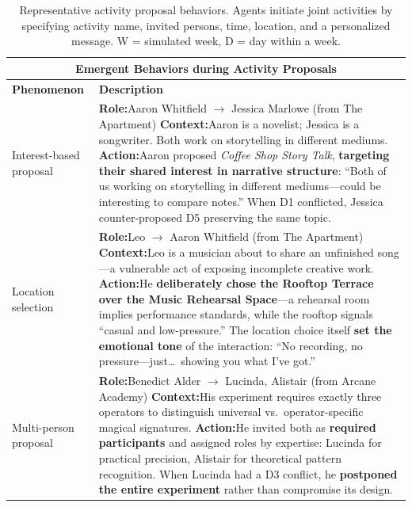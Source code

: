   \begin{table}[t]
  \centering
  \small
  \caption{Representative activity proposal behaviors. Agents initiate joint activities by specifying activity name, invited persons, time, location, and a personalized message. W = simulated week, D = day within a week.}
  \label{tab:proposals}
  \begin{tabular}{p{0.8in}p{4.3in}}
  \toprule
  \multicolumn{2}{c}{\textbf{Emergent Behaviors during Activity Proposals}} \\
  \midrule
  \textbf{Phenomenon} & \textbf{Description} \\
  \midrule
  
  Interest-based \newline proposal
  &
  \textbf{Role:}\quad Aaron Whitfield $\to$ Jessica Marlowe \hfill (from The Apartment) \newline
  \textbf{Context:}\quad Aaron is a novelist; Jessica is a songwriter. Both work on storytelling in different mediums. \newline
  \textbf{Action:}\quad Aaron proposed \emph{Coffee Shop Story Talk}, \textbf{targeting their shared interest in narrative structure}: ``Both of us working on storytelling in different mediums---could be interesting to compare notes.'' When D1 conflicted, Jessica counter-proposed D5 preserving the same topic.
  \\
  \midrule
  
  Location \newline selection
  &
  \textbf{Role:}\quad Leo $\to$ Aaron Whitfield \hfill (from The Apartment) \newline
  \textbf{Context:}\quad Leo is a musician about to share an unfinished song---a vulnerable act of exposing incomplete creative work. \newline
  \textbf{Action:}\quad He \textbf{deliberately chose the Rooftop Terrace over the Music Rehearsal Space}---a rehearsal room implies performance standards, while the rooftop signals ``casual and low-pressure.'' The location choice itself \textbf{set the emotional tone} of the interaction: ``No recording, no pressure---just\ldots\ showing you what I've got.''
  \\
  \midrule
  
  Multi-person \newline proposal
  &
  \textbf{Role:}\quad Benedict Alder $\to$ Lucinda, Alistair \hfill (from Arcane Academy) \newline
  \textbf{Context:}\quad His experiment requires exactly three operators to distinguish universal vs.\ operator-specific magical signatures. \newline
  \textbf{Action:}\quad He invited both as \textbf{required participants} and assigned roles by expertise: Lucinda for practical precision, Alistair for theoretical pattern recognition. When Lucinda had a D3 conflict, he \textbf{postponed the entire experiment} rather than compromise its design.
  \\
  \midrule
  

\end{tabular}
\end{table}
